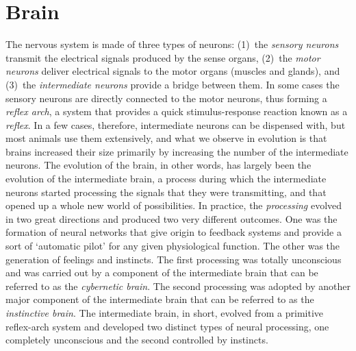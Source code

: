 \documentclass[12pt]{article}
\begin{document}
\section{Brain}
The nervous system is made of three types of neurons: (1)~the \textit{sensory neurons} transmit the electrical signals produced by the sense organs, (2)~the \textit{motor neurons} deliver electrical signals to the motor organs (muscles and glands), and (3)~the \textit{intermediate neurons} provide a bridge between them. In some cases the sensory neurons are directly connected to the motor neurons, thus forming a \textit{reflex arch}, a system that provides a quick stimulus-response reaction known as a \textit{reflex}. In a few cases, therefore, intermediate neurons can be dispensed with, but most animals use them extensively, and what we observe in evolution is that brains increased their size primarily by increasing the number of the intermediate neurons. The evolution of the brain, in other words, has largely been the evolution of the intermediate brain, a process during which the intermediate neurons started processing the signals that they were transmitting, and that opened up a whole new world of possibilities. In practice, the \textit{processing} evolved in two great directions and produced two very different outcomes. One was the formation of neural networks that give origin to feedback systems and provide a sort of `automatic pilot' for any given physiological function. The other was the generation of feelings and instincts. The first processing was totally unconscious and was carried out by a component of the intermediate brain that can be referred to as the \textit{cybernetic brain}. The second processing was adopted by another major component of the intermediate brain that can be referred to as the \textit{instinctive brain}. The intermediate brain, in short, evolved from a primitive reflex-arch system and developed two distinct types of neural processing, one completely unconscious and the second controlled by instincts. 
 
\end{document}
